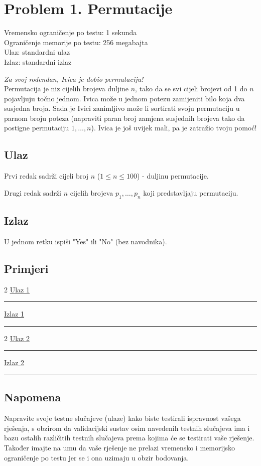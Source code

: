 \documentclass{article}
\def\inputdataname{Ulaz } %
\def\outputdataname{Izlaz } %
\newcommand{\iodataNo}[1]{%
\begin{minipage}{\textwidth}
\begin{multicols}{2}
\href{run:input#1.txt}{\inputdataname#1} \\
\rule{\columnwidth}{1pt}

\columnbreak
\href{run:output#1.txt}{\outputdataname#1} \\
\rule{\columnwidth}{1pt}

\end{multicols}
\vspace{\baselineskip}
\end{minipage}
}
\begin{document}
\section{Problem 1. Permutacije}

\begin{center}
Vremensko ograničenje po testu: 1 sekunda \\
Ograničenje memorije po testu: 256 megabajta \\
Ulaz: standardni ulaz \\
Izlaz: standardni izlaz \\
\end{center}
\textit{Za svoj rođendan, Ivica je dobio permutaciju!} \\
Permutacija je niz cijelih brojeva duljine $n$, tako da se svi cijeli brojevi od 1 do $n$ pojavljuju točno jednom. Ivica može u jednom potezu zamijeniti bilo koja dva susjedna broja. Sada je Ivici zanimljivo može li sortirati svoju permutaciju u parnom broju poteza (napraviti paran broj zamjena susjednih brojeva tako da postigne permutaciju $1, \ldots, n$). Ivica je još uvijek mali, pa je zatražio tvoju pomoć!

\subsection{Ulaz}
Prvi redak sadrži cijeli broj $n$ ($1 \leq n \leq 100$) - duljinu permutacije. \newline

Drugi redak sadrži $n$ cijelih brojeva $p_1, \ldots, p_n$ koji predstavljaju permutaciju.

\subsection{Izlaz}
U jednom retku ispiši "Yes" ili "No" (bez navodnika).

\subsection{Primjeri}

\iodataNo{1}
\iodataNo{2}


\subsection{Napomena}
Napravite svoje testne slučajeve (ulaze) kako biste testirali ispravnost vašega rješenja, s obzirom da validacijski sustav osim navedenih testnih slučajeva ima i bazu ostalih različitih testnih slučajeva prema kojima će se testirati vaše rješenje. Također imajte na umu da vaše rješenje ne prelazi vremensko i memorijsko ograničenje po testu jer se i ona uzimaju u obzir bodovanja.
\end{document}
